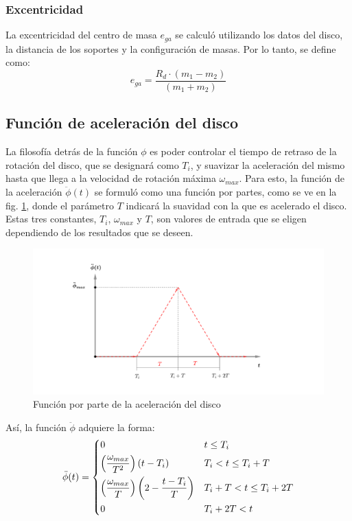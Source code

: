 \subsubsection{Excentricidad}
La excentricidad del centro de masa $e_{ga}$ se calculó utilizando los datos del disco, la distancia de los soportes y la configuración de masas. Por lo tanto, se define como:
\begin{equation}
	e_{ga} = \frac{R_d\cdot (m_1 - m_2)}{(m_1 + m_2)}
\end{equation}
\subsection{Función de aceleración del disco}
\label{sec:function_angle}
La filosofía detrás de la función $\phi$ es poder controlar el tiempo de retraso de la rotación del disco, que se designará como $T_i$, y suavizar la aceleración del mismo hasta que llega a la velocidad de rotación máxima $\omega_{max}$. Para esto, la función de la aceleración $\ddot{\phi}(t)$ se formuló como una función por partes, como se ve en la fig. \ref{fig:anglepp}, donde el parámetro $T$ indicará la suavidad con la que es acelerado el disco. Estas tres constantes, $T_i$, $\omega_{max}$ y $T$, son valores de entrada que se eligen dependiendo de los resultados que se deseen.
\begin{figure}[h]
\centering
\includegraphics[width=0.9\linewidth, trim={6.5cm 2cm 10cm 2cm},clip]{Imagenes/anglepp_function.pdf}
\caption{Función por parte de la aceleración del disco}
\label{fig:anglepp}
\end{figure}
Así, la función $\ddot{\phi}$ adquiere la forma:
\[ \ddot{\phi}(t) =
\begin{dcases}
	0																		&	t \leq T_i \\
	\left(\frac{\omega_{max}}{T^2}\right)\left(t - T_i\right)				&	T_i < t \leq T_i + T\\
	\left(\frac{\omega_{max}}{T}\right)\left(2 - \frac{t - T_i}{T}\right)	&	T_i + T < t \leq T_i + 2T\\
	0																		&	T_i + 2T < t\\
\end{dcases} 
\]
